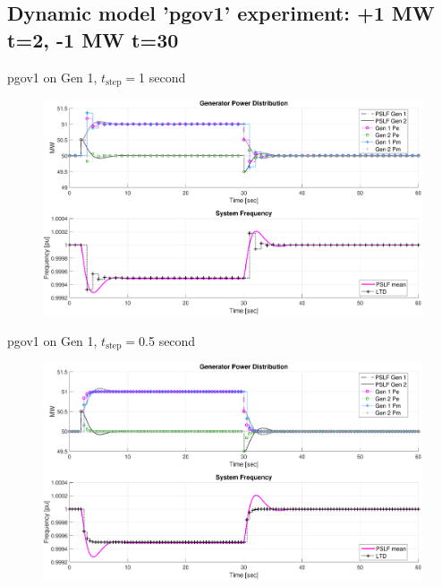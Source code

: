 \documentclass[14pt, unknownkeysallowed]{beamer}
\begin{document}
\subsection{Dynamic model 'pgov1' experiment: +1 MW t=2, -1 MW t=30}
\begin{frame}
pgov1 on Gen 1, $t_\text{step}=$1 second
\begin{figure}
	\includegraphics[width=\linewidth]{pgov1A}
\end{figure}
\end{frame}
\begin{frame}
pgov1 on Gen 1, $t_\text{step}=$0.5 second
\begin{figure}
\includegraphics[width=\linewidth]{pgov1C}
\end{figure}
\end{frame}
\end{document}
